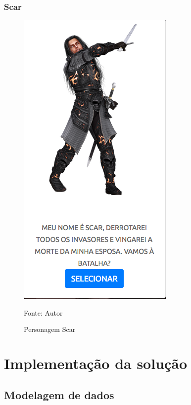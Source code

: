 \subsection{Scar}
\begin{figure}[h]
	\centering
	\includegraphics[keepaspectratio=true,scale=0.5]{figuras/scar.png}
	\caption{Personagem Scar}
	Fonte: Autor
	\label{scar}
\end{figure}

\chapter{Implementação da solução}

\section{Modelagem de dados}

